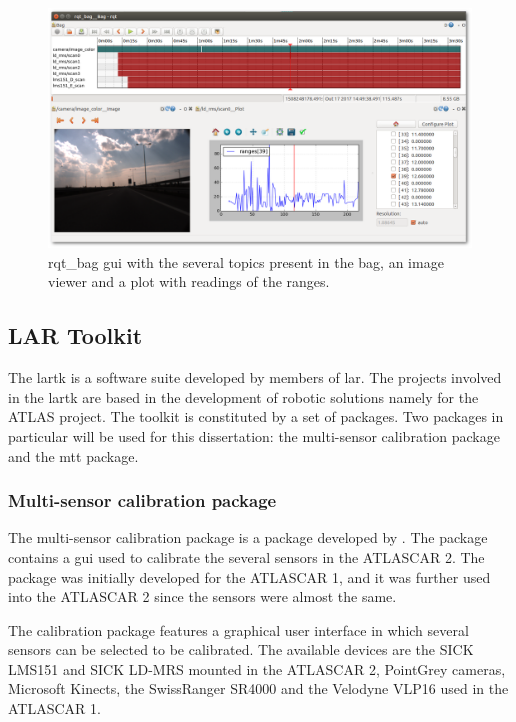 \begin{figure}[htp]
	\centering
	\includegraphics[width=.99\textwidth]{capexp/imgs/rqt_bag.png}
	\caption{rqt\_bag \gls{gui} with the several topics present in the bag, an image viewer and a plot with readings of the ranges.}
	\label{fig:rqtbag}
\end{figure}


\subsection{LAR Toolkit}

The \gls{lartk} is a software suite developed by members of \gls{lar}. The projects involved in the \gls{lartk} are based in the development of robotic solutions namely for the ATLAS project. The toolkit is constituted by a set of packages. Two packages in particular will be used for this dissertation: the multi-sensor calibration package and the \gls{mtt} package.

\subsubsection{Multi-sensor calibration package}

The multi-sensor calibration package is a package developed by \cite{VieiradaSilva2016}. The package contains a \gls{gui} used to calibrate the several sensors in the ATLASCAR 2. The package was initially developed for the ATLASCAR 1, and it was further used into the ATLASCAR 2 since the sensors were almost the same.

The calibration package features a graphical user interface in which several sensors can be selected to be calibrated. The available devices are the SICK LMS151 and SICK LD-MRS mounted in the ATLASCAR 2, PointGrey cameras, Microsoft Kinects, the SwissRanger SR4000 and the Velodyne VLP16 used in the ATLASCAR 1.

